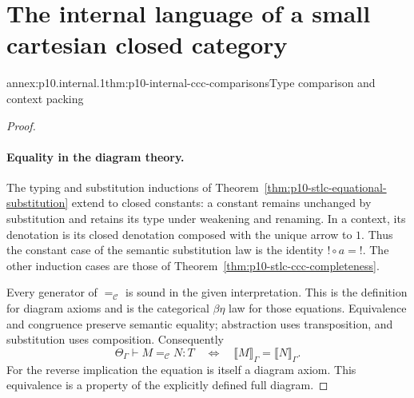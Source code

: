 
\section{The internal language of a small cartesian closed category}

\begin{annexitem}{annex:p10.internal.1}{thm:p10-internal-ccc-comparisons}{Type comparison and context packing}
\begin{proof}
\paragraph{Equality in the diagram theory.}
The typing and substitution inductions of
Theorem~\ref{thm:p10-stlc-equational-substitution} extend to closed
constants: a constant remains unchanged by substitution and retains
its type under weakening and renaming.
In a context, its denotation is its closed denotation composed with
the unique arrow to \(1\).  Thus the constant case of the semantic
substitution law is the identity \(!\circ a=!\).
The other induction cases are those of
Theorem~\ref{thm:p10-stlc-ccc-completeness}.

Every generator of \(=_{\mathcal C}\) is sound in the given
interpretation.  This is the definition for diagram axioms and is
the categorical \(\beta\eta\) law for those equations.
Equivalence and congruence preserve semantic equality; abstraction
uses transposition, and substitution uses composition.
Consequently
\[
 \Theta_\Gamma\vdash M=_{\mathcal C}N:T
 \quad\Longleftrightarrow\quad
 \llbracket M\rrbracket_\Gamma=\llbracket N\rrbracket_\Gamma.
\]
For the reverse implication the equation is itself a diagram axiom.
This equivalence is a property of the explicitly defined full diagram.


\end{proof}
\end{annexitem}
